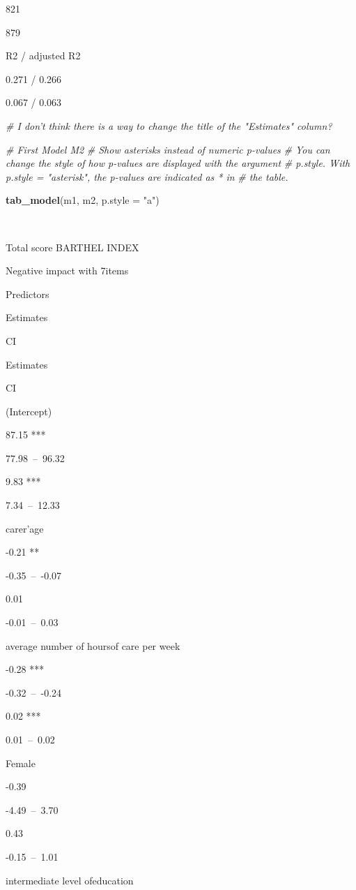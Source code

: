 \documentclass[]{article}
\newenvironment{Shaded}{\begin{snugshade}}{\end{snugshade}}
\newcommand{\KeywordTok}[1]{\textcolor[rgb]{0.13,0.29,0.53}{\textbf{#1}}}
\newcommand{\DataTypeTok}[1]{\textcolor[rgb]{0.13,0.29,0.53}{#1}}
\newcommand{\StringTok}[1]{\textcolor[rgb]{0.31,0.60,0.02}{#1}}
\newcommand{\CommentTok}[1]{\textcolor[rgb]{0.56,0.35,0.01}{\textit{#1}}}
\newcommand{\NormalTok}[1]{#1}
\begin{document}
821

879

R2 / adjusted R2

0.271 / 0.266

0.067 / 0.063

\begin{Shaded}
\begin{Highlighting}[]
\CommentTok{# I don't think there is a way to change the title of the "Estimates" column?}

\CommentTok{# First Model   M2}
\CommentTok{# Show asterisks instead of numeric p-values}
\CommentTok{# You can change the style of how p-values are displayed with the argument}
\CommentTok{# p.style. With p.style = "asterisk", the p-values are indicated as * in }
\CommentTok{# the table.}

\KeywordTok{tab_model}\NormalTok{(m1, m2, }\DataTypeTok{p.style =} \StringTok{"a"}\NormalTok{)}
\end{Highlighting}
\end{Shaded}

~

Total score BARTHEL INDEX

Negative impact with 7items

Predictors

Estimates

CI

Estimates

CI

(Intercept)

87.15 ***

77.98~--~96.32

9.83 ***

7.34~--~12.33

carer'age

-0.21 **

-0.35~--~-0.07

0.01

-0.01~--~0.03

average number of hoursof care per week

-0.28 ***

-0.32~--~-0.24

0.02 ***

0.01~--~0.02

Female

-0.39

-4.49~--~3.70

0.43

-0.15~--~1.01

intermediate level ofeducation
\end{document}
